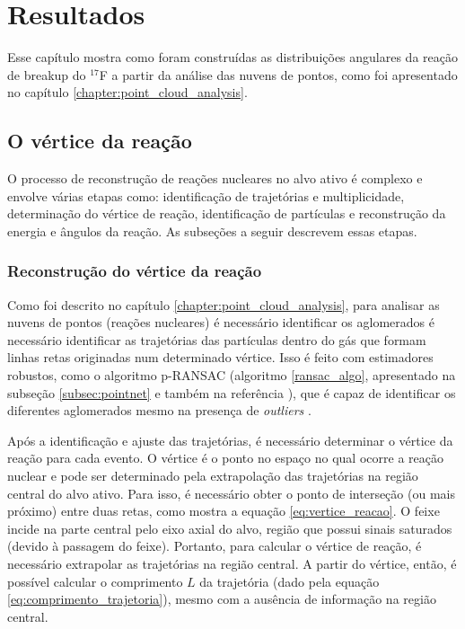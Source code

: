 \documentclass[a4paper,12pt,oneside]{book}
\begin{document}
\chapter{Resultados}\label{chapter:resultados}

\par Esse capítulo mostra como foram construídas as distribuições angulares da reação de breakup do $^{17}$F a partir da análise das nuvens de pontos, como foi apresentado no capítulo \ref{chapter:point_cloud_analysis}.

\section{O vértice da reação}\label{sec:identif_reac_nucl}

\par O processo de reconstrução de reações nucleares no alvo ativo é complexo e envolve várias etapas como: identificação de trajetórias e multiplicidade, determinação do vértice de reação, identificação de partículas e reconstrução da energia e ângulos da reação. As subseções a seguir descrevem essas etapas.

\subsection{Reconstrução do vértice da reação}

\par Como foi descrito no capítulo \ref{chapter:point_cloud_analysis}, para analisar as nuvens de pontos (reações nucleares) é necessário identificar os aglomerados é necessário identificar as trajetórias das partículas dentro do gás que formam linhas retas originadas num determinado vértice. Isso é feito com estimadores robustos, como o algoritmo p-RANSAC (algoritmo \ref{ransac_algo}, apresentado na subseção \ref{subsec:pointnet} e também na referência \cite{artigo}), que é capaz de identificar os diferentes aglomerados mesmo na presença de \textit{outliers} \cite{artigo}.

\par Após a identificação e ajuste das trajetórias, é necessário determinar o vértice da reação para cada evento. O vértice é o ponto no espaço no qual ocorre a reação nuclear e pode ser determinado pela extrapolação das trajetórias na região central do alvo ativo. Para isso, é necessário obter o ponto de interseção (ou mais próximo) entre duas retas, como mostra a  equação \ref{eq:vertice_reacao}. O feixe incide na parte central pelo eixo axial do alvo, região que possui sinais saturados (devido à passagem do feixe). Portanto, para calcular o vértice de reação, é necessário extrapolar as trajetórias na região central. A partir do vértice, então, é possível calcular o comprimento $L$ da trajetória (dado pela equação \ref{eq:comprimento_trajetoria}), mesmo com a ausência de informação na região central.
\end{document}
